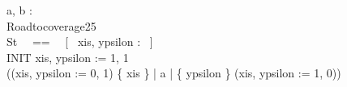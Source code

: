 \begin{circus}
\circchannel a, b : \nat \\%
\circprocess Roadtocoverage25 \circdef \circbegin \\
	\circstate St ~~==~~ [~ xis, ypsilon : \nat ~] \\
	INIT \circdef xis, ypsilon := 1, 1 \\
	\circspot ((xis, ypsilon := 0, 1) \lpar \{ xis \} | \lchanset a \rchanset | \{ ypsilon \} \rpar (xis, ypsilon := 1, 0)) %
	\\
	\circend
\end{circus}
